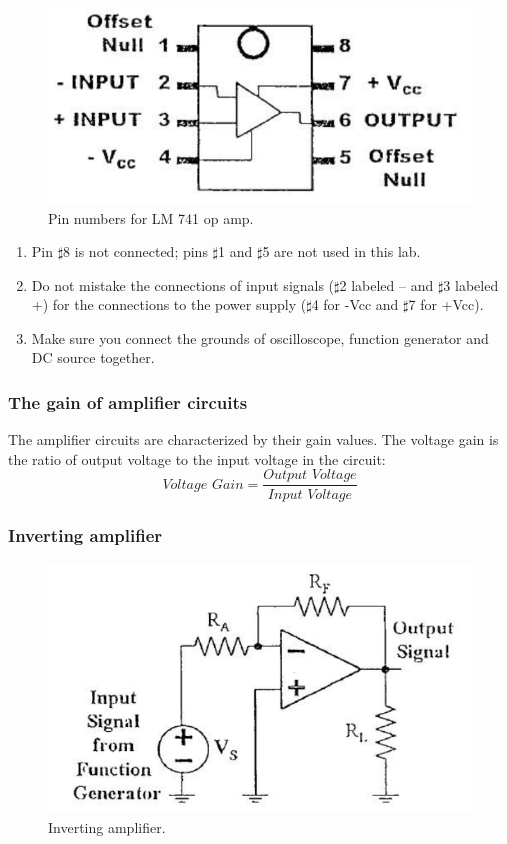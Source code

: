 \documentclass{article}
\begin{document}
\begin{figure}[H]
\centering
\includegraphics[scale=1]{pin.png}
\caption{Pin numbers for LM 741 op amp.}\label{FigPin}
\end{figure}
\begin{enumerate}
\item Pin $\sharp$8 is not connected; pins $\sharp$1 and $\sharp$5 are not used in this lab.
\item Do not mistake the connections of input signals ($\sharp$2 labeled – and $\sharp$3 labeled +) for the connections to the power supply ($\sharp$4 for -Vcc and $\sharp$7 for +Vcc).
\item Make sure you connect the grounds of oscilloscope, function generator and DC source together.
\end{enumerate}

\subsubsection{The gain of amplifier circuits}

The amplifier circuits are characterized by their gain values. The voltage gain is the ratio of output voltage to the input voltage in the circuit: 
$$Voltage\,\,Gain = \frac{Output\,\,Voltage}{Input\,\,Voltage}$$

\subsubsection{Inverting amplifier}

\begin{figure}[H]
\centering
\includegraphics[scale=1]{inverting.png}
\caption{Inverting amplifier.}\label{FigInv}
\end{figure}
\end{document}
